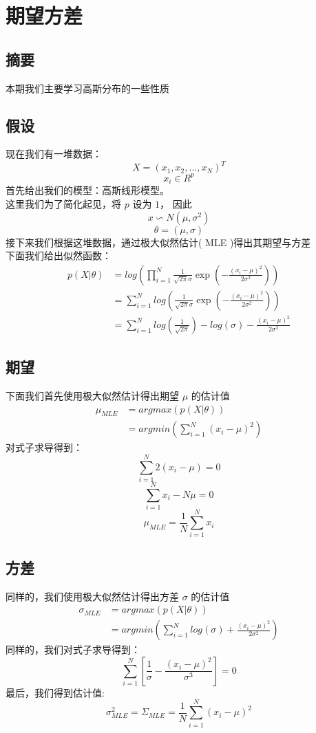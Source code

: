\documentclass{report}
\begin{document}
\chapter{期望方差}
\section{摘要}
本期我们主要学习高斯分布的一些性质
\section{假设}
现在我们有一堆数据：
$$
X=(x_1, x_2, ..., x_N)^T
$$
$$
x_i \in R^p
$$
首先给出我们的模型：高斯线形模型。\\
这里我们为了简化起见，将 $p$ 设为 $1$， 因此 
$$
x \backsim N(\mu, \sigma^2)
$$
$$
\theta=(\mu, \sigma)
$$ 
接下来我们根据这堆数据，通过极大似然估计( MLE )得出其期望与方差\\
下面我们给出似然函数：
$$
\begin{aligned}
p(X|\theta)&=log(\prod_{i=1}^N \frac{1}{\sqrt{2\pi}\sigma} \exp(-\frac{(x_i-\mu)^2}{2\sigma^2})) \\
&=\sum_{i=1}^N log(\frac{1}{\sqrt{2\pi}\sigma} \exp(-\frac{(x_i-\mu)^2}{2\sigma^2}))\\
&=\sum_{i=1}^N log(\frac{1}{\sqrt{2\pi}}) - log(\sigma) - \frac{(x_i-\mu)^2}{2\sigma^2}
\end{aligned}
$$
\section{期望}
下面我们首先使用极大似然估计得出期望 $\mu$ 的估计值
$$
\begin{aligned}
\mu_{MLE}
&=argmax(p(X|\theta))\\
&=argmin(\sum_{i=1}^N (x_i-\mu)^2)
\end{aligned}
$$
对式子求导得到：
$$
\sum_{i=1}^N 2(x_i-\mu)=0
$$
$$
\sum_{i=1}^N x_i - N \mu=0
$$
$$
\mu_{MLE}=\frac{1}{N} \sum_{i=1}^N x_i
$$
\section{方差}
同样的，我们使用极大似然估计得出方差 $\sigma$ 的估计值
$$
\begin{aligned}
\sigma_{MLE}
&=argmax(p(X|\theta))\\
&=argmin(\sum_{i=1}^N log(\sigma)+\frac{(x_i-\mu)^2}{2\sigma^2})
\end{aligned}
$$
同样的，我们对式子求导得到：
$$
\sum_{i=1}^N[\frac{1}{\sigma}-\frac{(x_i-\mu)^2}{\sigma^3}]=0
$$
最后，我们得到估计值:
$$
\sigma_{MLE}^2 = \Sigma_{MLE} = \frac{1}{N} \sum_{i=1}^N (x_i-\mu)^2
$$
\end{document}
